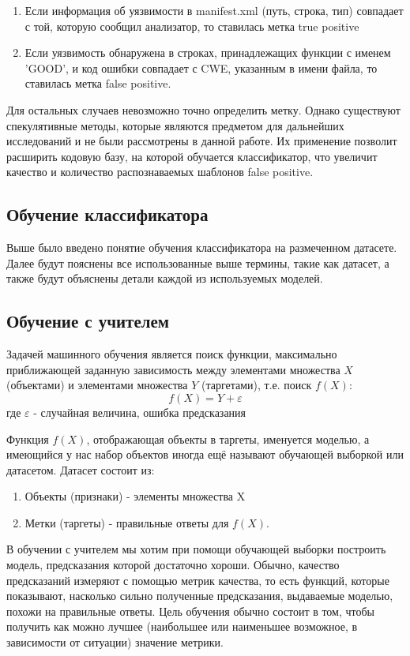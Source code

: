 \begin{enumerate}
    \item Если информация об уязвимости в manifest.xml (путь, строка, тип) совпадает с той, которую сообщил анализатор, то ставилась метка true positive
    \item Если уязвимость обнаружена в строках, принадлежащих функции с именем 'GOOD', и код ошибки совпадает с CWE, указанным в имени файла, то ставилась метка false positive.
\end{enumerate}

Для остальных случаев невозможно точно определить метку. Однако существуют спекулятивные методы, которые являются предметом для дальнейших исследований и не были рассмотрены в данной работе. Их применение позволит расширить кодовую базу, на которой обучается классификатор, что увеличит качество и количество распознаваемых шаблонов false positive.

\subsection{Обучение классификатора}

Выше было введено понятие обучения классификатора на размеченном датасете. Далее будут пояснены все использованные выше термины, такие как датасет, а также будут объяснены детали каждой из используемых моделей.

\subsection{Обучение с учителем}

Задачей машинного обучения является поиск функции, максимально приближающей заданную зависимость между элементами множества $X$ (объектами) и элементами множества $Y$ (таргетами), т.е. поиск $f(X):$
\[f(X) = Y + \varepsilon\]
где $\varepsilon$ - случайная величина, ошибка предсказания

Функция $f(X)$, отображающая объекты в таргеты, именуется моделью, а имеющийся у нас набор объектов иногда ещё называют обучающей выборкой или датасетом. Датасет состоит из:

\begin{enumerate}
    \item Объекты (признаки) - элементы множества X
    \item Метки (таргеты) - правильные ответы для $f(X)$.
\end{enumerate}

В обучении с учителем мы хотим при помощи обучающей выборки построить модель, предсказания которой достаточно хороши. Обычно, качество предсказаний измеряют с помощью метрик качества, то есть функций, которые показывают, насколько сильно полученные предсказания, выдаваемые моделью, похожи на правильные ответы. Цель обучения обычно состоит в том, чтобы получить как можно лучшее (наибольшее или наименьшее возможное, в зависимости от ситуации) значение метрики.

